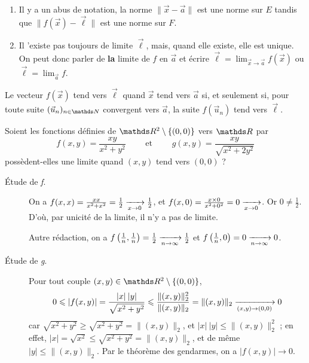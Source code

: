 \begin{rmk}
	\begin{enumerate}
		\item Il y a un abus de notation, la norme $\|\vec{x} - \vec{a}\|$\/ est une norme sur $E$\/ tandis que $\|f(\vec{x}) - \vec{\ell}\|$\/ est une norme sur $F$.
		\item Il 'existe pas toujours de limite $\vec{\ell}$, mais, quand elle existe, elle est unique. On peut donc parler de \textbf{la} limite de $f$\/ en $\vec{a}$\/ et écrire $\vec{\ell} = \lim_{\vec{x}\to \vec{a}} f(\vec{x})$\/ ou $\vec{\ell} = \lim_{\vec{a}} f$.
	\end{enumerate}
\end{rmk}

\begin{prop}
	Le vecteur $f(\vec{x})$\/ tend vers $\vec{\ell}$\/ quand $\vec{x}$\/ tend vers $\vec{a}$\/ si, et seulement si, pour toute suite $(\vec{u}_n)_{n\in\N}$\/ convergent vers $\vec{a}$, la suite $f(\vec{u}_n)$\/ tend vers $\vec{\ell}$.
\end{prop}

\begin{exo}
	\begin{slshape}
		Soient les fonctions définies de $\R^2 \setminus \{(0,0)\}$\/ vers $\R$\/ par \[
			f(x,y) = \frac{xy}{x^2 + y^2} \quad\quad \text{ et }\quad\quad g(x, y) = \frac{xy}{\sqrt{x^2 + 2y^2}}
		\]possèdent-elles une limite quand $(x,y)$\/ tend vers $(0, 0)$ ?
	\end{slshape}

	\begin{description}
		\item[Étude de \textit{f}.] On a $f(x,x) = \frac{x x}{x^2 + x^2} = \frac{1}{2}\xrightarrow[x\to 0]{} \frac{1}{2}$, et $f(x, 0) = \frac{x \times 0}{x^2 + 0^2} = 0 \xrightarrow[x\to 0]{}$. Or $0 \neq \frac{1}{2}$. D'où, par unicité de la limite, il n'y a pas de limite.

			Autre rédaction, on a $f\left( \frac{1}{n}, \frac{1}{n} \right) = \frac{1}{2} \xrightarrow[n\to \infty]{} \frac{1}{2}$\/ et $f\left( \frac{1}{n}, 0 \right) = 0 \xrightarrow[n\to \infty]{} 0$.
		\item[Étude de \textit{g}.] Pour tout couple $(x,y) \in \R^2 \setminus \{(0,0)\}$, \[
				0 \leqslant |f(x,y)| = \frac{|x|\:|y|}{\sqrt{x^2 + y^2}} \leqslant \frac{\|(x,y)\|_2^2}{\|(x,y)\|_2} = \|(x,y)\|_2 \xrightarrow[(x,y) \to (0,0)]{} 0
			\]car $\sqrt{x^2 + y^2} \ge \sqrt{x^2+y^2} = \|(x,y)\|_2$, et $|x|\:|y| \le \|(x,y)\|^2_2$ ; en effet, $|x| = \sqrt{x^2} \le \sqrt{x^2+y^2} = \|(x,y)\|_2$, et de même $|y| \le \|(x,y)\|_2$.
			Par le théorème des gendarmes, on a $|f(x,y)| \to 0$.
	\end{description}
\end{exo}

